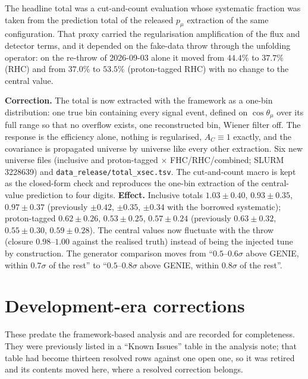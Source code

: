 The headline total was a cut-and-count evaluation whose systematic fraction was taken from
the prediction total of the released $p_\mu$ extraction of the same configuration. That
proxy carried the regularisation amplification of the flux and detector terms, and it
depended on the fake-data throw through the unfolding operator: on the re-throw of
2026-09-03 alone it moved from $44.4\%$ to $37.7\%$ (RHC) and from $37.0\%$ to $53.5\%$
(proton-tagged RHC) with no change to the central value.

\textbf{Correction.} The total is now extracted with the framework as a one-bin
distribution: one true bin containing every signal event, defined on $\cos\theta_\mu$
over its full range so that no overflow exists, one reconstructed bin, Wiener filter off.
The response is the efficiency alone, nothing is regularised, $A_C\equiv1$ exactly, and
the covariance is propagated universe by universe like every other extraction. Six new
universe files (inclusive and proton-tagged $\times$ FHC/RHC/combined; SLURM 3228639) and
\texttt{data\_release/total\_xsec.tsv}. The cut-and-count macro is kept as the
closed-form check and reproduces the one-bin extraction of the central-value prediction to
four digits.
\textbf{Effect.} Inclusive totals $1.03\pm0.40$, $0.93\pm0.35$, $0.97\pm0.37$
(previously $\pm0.42$, $\pm0.35$, $\pm0.34$ with the borrowed systematic); proton-tagged
$0.62\pm0.26$, $0.53\pm0.25$, $0.57\pm0.24$ (previously $0.63\pm0.32$, $0.55\pm0.30$,
$0.59\pm0.28$). The central values now fluctuate with the throw (closure $0.98$--$1.00$
against the realised truth) instead of being the injected tune by construction. The
generator comparison moves from ``$0.5$--$0.6\sigma$ above GENIE, within $0.7\sigma$ of
the rest'' to ``$0.5$--$0.8\sigma$ above GENIE, within $0.8\sigma$ of the rest''.

\section{Development-era corrections}

These predate the framework-based analysis and are recorded for completeness.  They were
previously listed in a ``Known Issues'' table in the analysis note; that table had become
thirteen resolved rows against one open one, so it was retired and its contents moved
here, where a resolved correction belongs.

